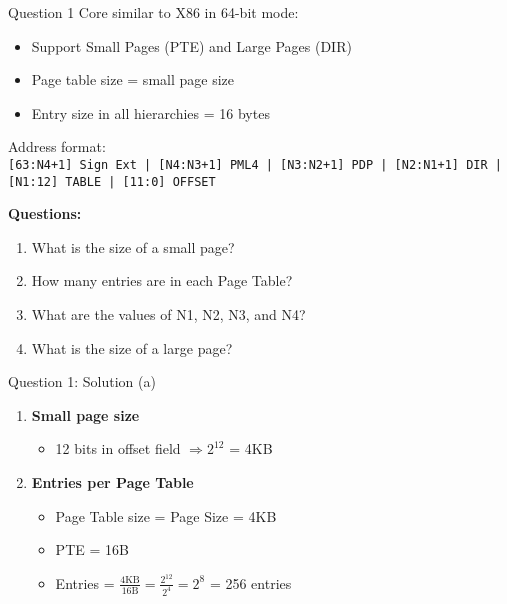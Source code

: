 \documentclass[aspectratio=169,12pt]{beamer}
\begin{document}
\begin{frame}{Question 1}
Core similar to X86 in 64-bit mode:
\begin{itemize}
    \item Support Small Pages (PTE) and Large Pages (DIR)
    \item Page table size = small page size
    \item Entry size in all hierarchies = 16 bytes
\end{itemize}

\vspace{0.5em}
Address format:\\
\texttt{[63:N4+1] Sign Ext | [N4:N3+1] PML4 | [N3:N2+1] PDP | [N2:N1+1] DIR | [N1:12] TABLE | [11:0] OFFSET}

\vspace{0.5em}
\textbf{Questions:}
\begin{enumerate}
    \item What is the size of a small page?
    \item How many entries are in each Page Table?
    \item What are the values of N1, N2, N3, and N4?
    \item What is the size of a large page?
\end{enumerate}
\end{frame}

\begin{frame}{Question 1: Solution (a)}
\begin{enumerate}
    \item \textbf{Small page size}
    \begin{itemize}
        \item[] 12 bits in offset field $\Rightarrow 2^{12}$ = 4KB
    \end{itemize}
    \item \textbf{Entries per Page Table}
    \begin{itemize}
        \item Page Table size = Page Size = 4KB
        \item PTE = 16B
        \item Entries = $\frac{\text{4KB}}{\text{16B}} = \frac{2^{12}}{2^4} = 2^8$ = 256 entries
    \end{itemize}
\end{enumerate}
\end{frame}
\end{document}
